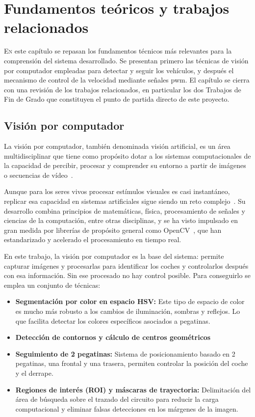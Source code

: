 \chapter{Fundamentos teóricos y trabajos relacionados}
\label{chap:fundamentos}

\lettrine{E}{n} este capítulo se repasan los fundamentos técnicos más relevantes para la comprensión del sistema desarrollado. Se presentan primero las técnicas de visión por computador empleadas para detectar y seguir los vehículos, y después el mecanismo de control de la velocidad mediante señales \gls{pwm}. El capítulo se cierra con una revisión de los trabajos relacionados, en particular los dos Trabajos de Fin de Grado que constituyen el punto de partida directo de este proyecto. 

\section{Visión por computador}
\label{sec:vision}

La visión por computador, también denominada visión artificial, es un área multidisciplinar que tiene como propósito dotar a los sistemas computacionales de la capacidad de percibir, procesar y comprender su entorno a partir de imágenes o secuencias de vídeo~\cite{szeliski2022}.

Aunque para los seres vivos procesar estímulos visuales es casi instantáneo, replicar esa capacidad en sistemas artificiales sigue siendo un reto complejo~\cite{szeliski2022}. Su desarrollo combina principios de matemáticas, física, procesamiento de señales y ciencias de la computación, entre otras disciplinas, y se ha visto impulsado en gran medida por librerías de propósito general como OpenCV~\cite{opencv}, que han estandarizado y acelerado el procesamiento en tiempo real.

En este trabajo, la visión por computador es la base del sistema: permite capturar imágenes y procesarlas para identificar los coches y controlarlos después con esa información. Sin ese procesado no hay control posible. Para conseguirlo se emplea un conjunto de técnicas:

\begin{itemize}
    \item \textbf{Segmentación por color en espacio HSV:} Este tipo de espacio de color es mucho más robusto a los cambios  de iluminación, sombras y reflejos. Lo que facilita detectar los colores específicos asociados a pegatinas.     
    \item \textbf{Detección de contornos y cálculo de centros geométricos} 
    \item \textbf{Seguimiento de 2 pegatinas:} Sistema de posicionamiento basado en 2 pegatinas, una frontal y una trasera, permiten controlar la posición del coche y el derrape.    
    \item \textbf{Regiones de interés (ROI) y máscaras de trayectoria:} Delimitación del área de búsqueda sobre el trazado del circuito para reducir la carga computacional y eliminar falsas detecciones en los márgenes de la imagen.
\end{itemize}

